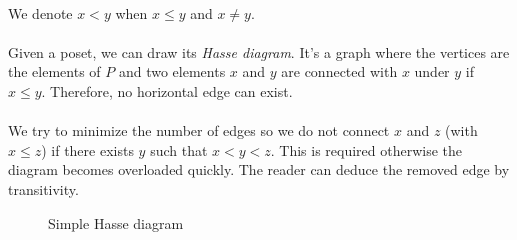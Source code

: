 \paragraph{}
We denote $x < y$ when $x \le y$ and $x \neq y$.

\paragraph{}
Given a poset, we can draw its \textit{Hasse diagram}. It's a graph where the vertices are the elements of $P$ and two elements $x$ and $y$ are connected with $x$ under $y$ if $x \le y$. Therefore, no horizontal edge can exist.

\paragraph{}
We try to minimize the number of edges so we do not connect $x$ and $z$ (with $x \le z$) if there exists $y$ such that $x < y < z$. This is required otherwise the diagram becomes overloaded quickly. The reader can deduce the removed edge by transitivity.

\begin{figure}[H]
  \begin{center}
    \caption{Simple Hasse diagram}
  \end{center}
\end{figure}

